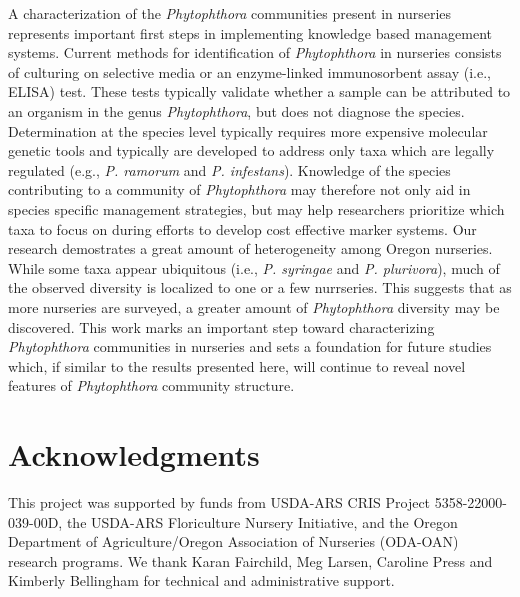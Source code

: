 \documentclass[12pt]{article}
\begin{document}

A characterization of the \emph{Phytophthora} communities present in nurseries represents important first steps in implementing knowledge based management systems.  Current methods for identification of \emph{Phytophthora} in nurseries consists of culturing on selective media \cite{jeffers_martin_1986} or an enzyme-linked immunosorbent assay (i.e., ELISA) test.  These tests typically validate whether a sample can be attributed to an organism in the genus \emph{Phytophthora}, but does not diagnose the species.  Determination at the species level typically requires more expensive molecular genetic tools \cite{grunwald_etal_2011} and typically are developed to address only taxa which are legally regulated (e.g., \emph{P. ramorum} and \emph{P. infestans}).  Knowledge of the species contributing to a community of \emph{Phytophthora} may therefore not only aid in species specific management strategies, but may help researchers prioritize which taxa to focus on during efforts to develop cost effective marker systems.  Our research demostrates a great amount of heterogeneity among Oregon nurseries.  While some taxa appear ubiquitous (i.e., \emph{P. syringae} and \emph{P. plurivora}), much of the observed diversity is localized to one or a few nurrseries.  This suggests that as more nurseries are surveyed, a greater amount of \emph{Phytophthora} diversity may be discovered.  This work marks an important step toward characterizing \emph{Phytophthora} communities in nurseries and sets a foundation for future studies which, if similar to the results presented here, will continue to reveal novel features of \emph{Phytophthora} community structure.






\section*{\sffamily\normalsize{Acknowledgments}}
This project was supported by funds from USDA-ARS CRIS Project 5358-22000-039-00D, the USDA-ARS Floriculture Nursery Initiative, and the Oregon Department of Agriculture/Oregon Association of Nurseries (ODA-OAN) research programs. We thank Karan Fairchild, Meg Larsen, Caroline Press and Kimberly Bellingham for technical and administrative support. 
\end{document}
